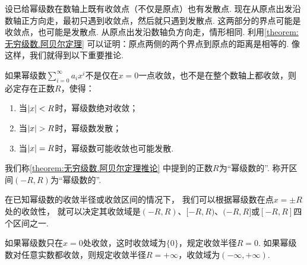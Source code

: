 设已给幂级数在数轴上既有收敛点（不仅是原点）也有发散点.
现在从原点出发沿数轴正方向走，最初只遇到收敛点，然后就只遇到发散点.
这两部分的界点可能是收敛点，也可能是发散点.
从原点出发沿数轴负方向走，情形相同.
利用\cref{theorem:无穷级数.阿贝尔定理} 可以证明：原点两侧的两个界点到原点的距离是相等的.
像这样，我们就得到以下重要推论.
\begin{corollary}\label{theorem:无穷级数.阿贝尔定理推论}
如果幂级数\(\sum\limits_{i=0}^\infty a_i x^i\)不是仅在\(x=0\)一点收敛，也不是在整个数轴上都收敛，则必定存在正数\(R\)，使得：\begin{enumerate}
\item 当\(\abs{x}<R\)时，幂级数绝对收敛；
\item 当\(\abs{x}>R\)时，幂级数发散；
\item 当\(\abs{x}=R\)时，幂级数可能收敛也可能发散.
\end{enumerate}
\end{corollary}

我们称\cref{theorem:无穷级数.阿贝尔定理推论} 中提到的正数\(R\)为“幂级数的”.
称开区间\((-R,R)\)为“幂级数的”.

在已知幂级数的收敛半径或收敛区间的情况下，%
我们可以根据幂级数在点\(x = \pm R\)处的收敛性，%
就可以决定其收敛域是\((-R,R)\)、\([-R,R)\)、\((-R,R]\)或\([-R,R]\)四个区间之一.

如果幂级数只在\(x=0\)处收敛，这时收敛域为\(\{0\}\)，规定收敛半径\(R=0\).
如果幂级数对任意实数都收敛，则规定收敛半径\(R=+\infty\)，收敛域为\((-\infty,+\infty)\).

